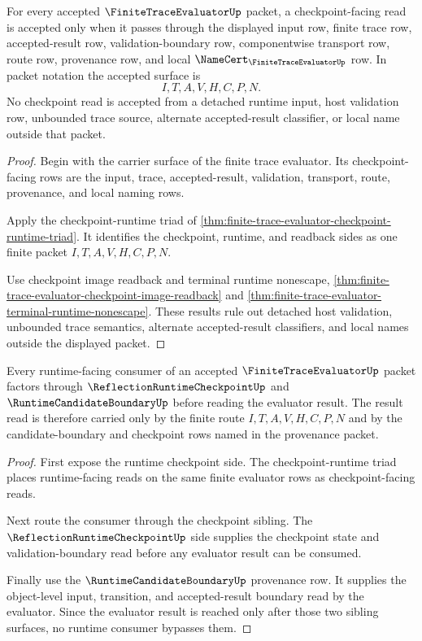 \begin{theorem}
\label{thm:finite-trace-evaluator-checkpoint-runtime-acceptance-lock}
For every accepted $\FiniteTraceEvaluatorUp$ packet, a checkpoint-facing read is accepted only when it passes through the displayed input row, finite trace row, accepted-result row, validation-boundary row, componentwise transport row, route row, provenance row, and local $\NameCert_{\FiniteTraceEvaluatorUp}$ row. In packet notation the accepted surface is
$$
I,T,A,V,H,C,P,N.
$$
No checkpoint read is accepted from a detached runtime input, host validation row, unbounded trace source, alternate accepted-result classifier, or local name outside that packet.
\end{theorem}
\begin{proof}
Begin with the carrier surface of the finite trace evaluator. Its checkpoint-facing rows are the input, trace, accepted-result, validation, transport, route, provenance, and local naming rows.

Apply the checkpoint-runtime triad of \autoref{thm:finite-trace-evaluator-checkpoint-runtime-triad}. It identifies the checkpoint, runtime, and readback sides as one finite packet $I,T,A,V,H,C,P,N$.

Use checkpoint image readback and terminal runtime nonescape, \autoref{thm:finite-trace-evaluator-checkpoint-image-readback} and \autoref{thm:finite-trace-evaluator-terminal-runtime-nonescape}. These results rule out detached host validation, unbounded trace semantics, alternate accepted-result classifiers, and local names outside the displayed packet.
\end{proof}

\begin{theorem}
\label{thm:finite-trace-evaluator-runtime-route-coverage}
Every runtime-facing consumer of an accepted $\FiniteTraceEvaluatorUp$ packet factors through $\ReflectionRuntimeCheckpointUp$ and $\RuntimeCandidateBoundaryUp$ before reading the evaluator result. The result read is therefore carried only by the finite route $I,T,A,V,H,C,P,N$ and by the candidate-boundary and checkpoint rows named in the provenance packet.
\end{theorem}
\begin{proof}
First expose the runtime checkpoint side. The checkpoint-runtime triad places runtime-facing reads on the same finite evaluator rows as checkpoint-facing reads.

Next route the consumer through the checkpoint sibling. The $\ReflectionRuntimeCheckpointUp$ side supplies the checkpoint state and validation-boundary read before any evaluator result can be consumed.

Finally use the $\RuntimeCandidateBoundaryUp$ provenance row. It supplies the object-level input, transition, and accepted-result boundary read by the evaluator. Since the evaluator result is reached only after those two sibling surfaces, no runtime consumer bypasses them.
\end{proof}

